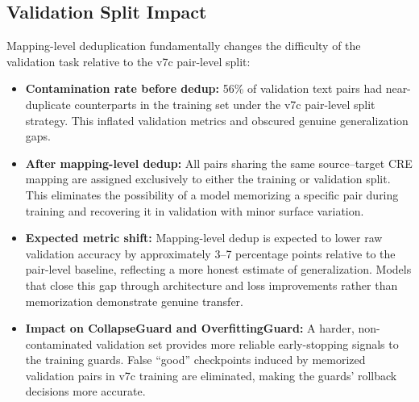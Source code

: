 \subsection{Validation Split Impact}

Mapping-level deduplication fundamentally changes the difficulty of
the validation task relative to the v7c pair-level split:

\begin{itemize}
    \item \textbf{Contamination rate before dedup:} 56\% of validation
          text pairs had near-duplicate counterparts in the training set
          under the v7c pair-level split strategy. This inflated
          validation metrics and obscured genuine generalization gaps.

    \item \textbf{After mapping-level dedup:} All pairs sharing the same
          source--target CRE mapping are assigned exclusively to either
          the training or validation split. This eliminates the
          possibility of a model memorizing a specific pair during
          training and recovering it in validation with minor surface
          variation.

    \item \textbf{Expected metric shift:} Mapping-level dedup is expected
          to lower raw validation accuracy by approximately 3--7
          percentage points relative to the pair-level baseline,
          reflecting a more honest estimate of generalization. Models
          that close this gap through architecture and loss improvements
          rather than memorization demonstrate genuine transfer.

    \item \textbf{Impact on CollapseGuard and OverfittingGuard:} A
          harder, non-contaminated validation set provides more reliable
          early-stopping signals to the training guards. False ``good''
          checkpoints induced by memorized validation pairs in v7c
          training are eliminated, making the guards' rollback decisions
          more accurate.
\end{itemize}

